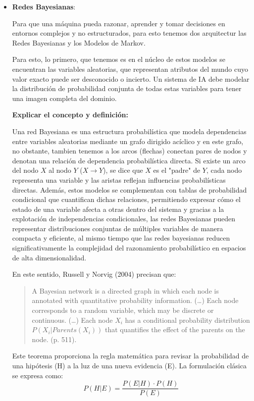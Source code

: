 \documentclass[letterpaper,12pt]{article}
\begin{document}
\begin{itemize}
    \item \textbf{Redes Bayesianas}:

    Para que una máquina pueda razonar, aprender y tomar decisiones  en entornos complejos y no estructurados, para esto tenemos dos arquitectur las Redes Bayesianas y los Modelos de Markov.

    Para esto, lo primero, que tenemos es en el núcleo de estos modelos se encuentran las variables aleatorias, que representan atributos del mundo cuyo valor exacto puede ser desconocido o incierto. Un sistema de IA debe modelar la distribución de probabilidad conjunta de todas estas variables para tener una imagen completa del dominio.

    \textbf{Explicar el concepto y definición:}
    
    Una red Bayesiana es una estructura probabilística que modela dependencias entre variables aleatorias mediante un grafo dirigido acíclico y en este grafo, no obstante, tambien tenemos a los arcos (flechas) conectan pares de nodos y denotan una relación de dependencia probabilística directa. Si existe un arco del nodo $X$ al nodo $Y$ ($X \rightarrow Y$), se dice que $X$ es el "padre" de $Y$, cada nodo representa una variable y las aristas reflejan influencias probabilísticas directas. Además, estos modelos se complementan con tablas de probabilidad condicional que cuantifican dichas relaciones, permitiendo expresar cómo el estado de una variable afecta a otras dentro del sistema y gracias a la explotación de independencias condicionales, las redes Bayesianas pueden representar distribuciones conjuntas de múltiples variables de manera compacta y eficiente, al mismo tiempo que las redes bayesianas reducen significativamente la complejidad del razonamiento probabilístico en espacios de alta dimensionalidad.
    
    En este sentido, Russell y Norvig (2004) precisan que:
    
    \begin{quote}
    \setlength{\leftskip}{0.5cm}
    A Bayesian network is a directed graph in which each node is annotated with quantitative probability information. (…) Each node corresponds to a random variable, which may be discrete or continuous. (…) Each node $X_i$ has a conditional probability distribution $P(X_i | Parents(X_i))$ that quantifies the effect of the parents on the node. (p. 511).
    \end{quote}

    Este teorema proporciona la regla matemática para revisar la probabilidad de una hipótesis (H) a la luz de una nueva evidencia (E). La formulación clásica se expresa como:$$P(H|E) = \frac{P(E|H) \cdot P(H)}{P(E)}$$
    

\end{itemize}
\end{document}
